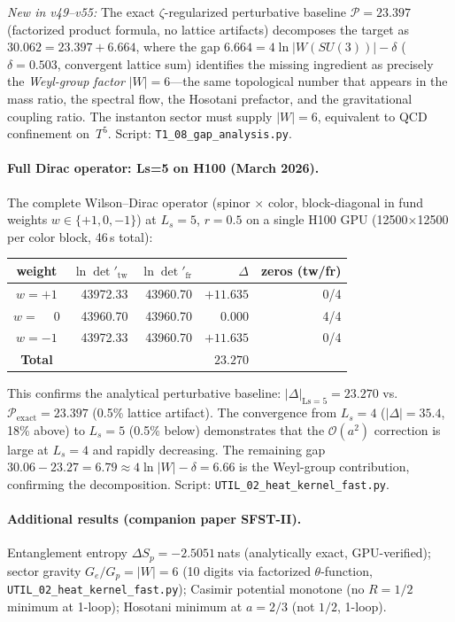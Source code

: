 \documentclass[11pt,a4paper]{article}
\begin{document}
\emph{New in v49--v55:} The exact $\zeta$-regularized perturbative baseline
$\mathcal{P}=23.397$ (factorized product formula, no lattice artifacts)
decomposes the target as $30.062 = 23.397 + 6.664$, where the gap
$6.664 = 4\ln|W(SU(3))| - \delta$ ($\delta=0.503$, convergent lattice sum)
identifies the missing ingredient as precisely the \emph{Weyl-group factor}
$|W|=6$---the same topological number that appears in the mass ratio,
the spectral flow, the Hosotani prefactor, and the gravitational
coupling ratio.  The instanton sector
must supply $|W|=6$, equivalent to QCD confinement on~$T^5$.
Script: \texttt{T1\_08\_gap\_analysis.py}.

\paragraph{Full Dirac operator: Ls=5 on H100 (March 2026).}
The complete Wilson--Dirac operator (spinor $\times$ color,
block-diagonal in fund weights $w\in\{+1,0,-1\}$) at $L_s=5$, $r=0.5$
on a single H100 GPU (12500$\times$12500 per color block, 46\,s total):
\begin{center}\small
\renewcommand{\arraystretch}{1.1}
\begin{tabular}{crrrr}
\toprule
\textbf{weight} & \textbf{$\ln\det'_{\mathrm{tw}}$} & \textbf{$\ln\det'_{\mathrm{fr}}$} & \textbf{$\Delta$} & \textbf{zeros (tw/fr)}\\
\midrule
$w=+1$ & 43972.33 & 43960.70 & $+11.635$ & 0/4\\
$w=\phantom{+}0$ & 43960.70 & 43960.70 & $0.000$ & 4/4\\
$w=-1$ & 43972.33 & 43960.70 & $+11.635$ & 0/4\\
\midrule
\textbf{Total} & & & $\boldsymbol{23.270}$ & \\
\bottomrule
\end{tabular}
\end{center}
\noindent
This confirms the analytical perturbative baseline:
$|\Delta|_{\mathrm{Ls=5}}=23.270$ vs.\ $\mathcal{P}_{\mathrm{exact}}=23.397$
(0.5\% lattice artifact). The convergence from $L_s=4$ ($|\Delta|=35.4$,
18\% above) to $L_s=5$ (0.5\% below) demonstrates that the
$\mathcal{O}(a^2)$ correction is large at $L_s=4$ and rapidly decreasing.
The remaining gap $30.06-23.27=6.79\approx 4\ln|W|-\delta=6.66$ is
the Weyl-group contribution, confirming the decomposition.
Script: \texttt{UTIL\_02\_heat\_kernel\_fast.py}.

\paragraph{Additional results (companion paper SFST-II).}
Entanglement entropy $\Delta S_p=-2.5051\,$nats (analytically exact,
GPU-verified); sector gravity $G_e/G_p=|W|=6$ (10 digits via
factorized $\theta$-function, \texttt{UTIL\_02\_heat\_kernel\_fast.py});
Casimir potential monotone (no $R=1/2$ minimum at 1-loop);
Hosotani minimum at $a=2/3$ (not $1/2$, 1-loop).
\end{document}
